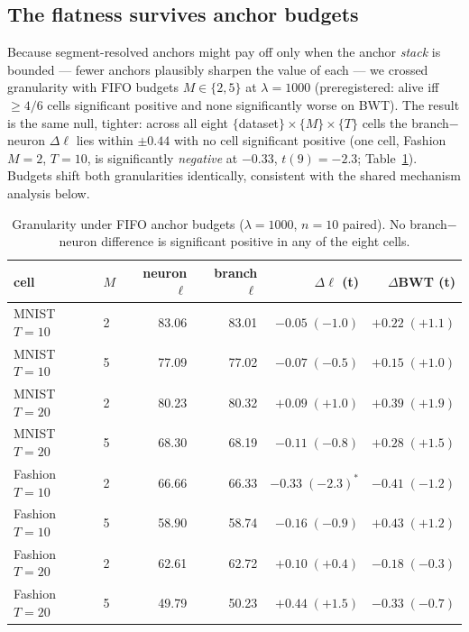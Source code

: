 \documentclass[10pt]{article}
\begin{document}
\subsection{The flatness survives anchor budgets}
\label{sec:budget}

Because segment-resolved anchors might pay off only when the anchor
\emph{stack} is bounded --- fewer anchors plausibly sharpen the value of
each --- we crossed granularity with FIFO budgets $M \in \{2, 5\}$ at
$\lambda{=}1000$ (preregistered: alive iff $\ge 4/6$ cells significant
positive and none significantly worse on BWT). The result is the same null,
tighter: across all eight $\{$dataset$\}\times\{M\}\times\{T\}$ cells the
branch$-$neuron $\Delta\ell$ lies within $\pm 0.44$ with no cell significant
positive (one cell, Fashion $M{=}2$, $T{=}10$, is significantly
\emph{negative} at $-0.33$, $t(9){=}-2.3$; Table~\ref{tab:budget}).
Budgets shift both granularities identically, consistent with the shared
mechanism analysis below.

\begin{table}[t]
\centering\small
\caption{Granularity under FIFO anchor budgets ($\lambda{=}1000$, $n{=}10$
paired). No branch$-$neuron difference is significant positive in any of
the eight cells.}
\label{tab:budget}
\begin{tabular}{llrrrr}
\toprule
cell & $M$ & neuron $\ell$ & branch $\ell$ & $\Delta\ell$ (t) & $\Delta$BWT (t) \\
\midrule
MNIST $T{=}10$  & 2 & 83.06 & 83.01 & $-0.05\;(-1.0)$ & $+0.22\;(+1.1)$ \\
MNIST $T{=}10$  & 5 & 77.09 & 77.02 & $-0.07\;(-0.5)$ & $+0.15\;(+1.0)$ \\
MNIST $T{=}20$  & 2 & 80.23 & 80.32 & $+0.09\;(+1.0)$ & $+0.39\;(+1.9)$ \\
MNIST $T{=}20$  & 5 & 68.30 & 68.19 & $-0.11\;(-0.8)$ & $+0.28\;(+1.5)$ \\
Fashion $T{=}10$ & 2 & 66.66 & 66.33 & $-0.33\;(-2.3)^{*}$ & $-0.41\;(-1.2)$ \\
Fashion $T{=}10$ & 5 & 58.90 & 58.74 & $-0.16\;(-0.9)$ & $+0.43\;(+1.2)$ \\
Fashion $T{=}20$ & 2 & 62.61 & 62.72 & $+0.10\;(+0.4)$ & $-0.18\;(-0.3)$ \\
Fashion $T{=}20$ & 5 & 49.79 & 50.23 & $+0.44\;(+1.5)$ & $-0.33\;(-0.7)$ \\
\bottomrule
\end{tabular}
\end{table}
\end{document}
